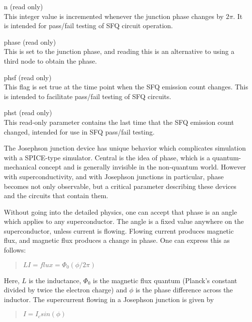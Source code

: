 \begin{description}
\item{\vt n} (read only)\\
This integer value is incremented whenever the junction phase changes
by $2\pi$.  It is intended for pass/fail testing of SFQ circuit
operation.
 
\item{\vt phase} (read only)\\
This is set to the junction phase, and reading this is an alternative
to using a third node to obtain the phase.
 
\item{\vt phsf} (read only)\\
This flag is set true at the time point when the SFQ emission count
changes.  This is intended to facilitate pass/fail testing of SFQ
circuits.

\item{\vt phst} (read only)\\
This read-only parameter contains the last time that the SFQ emission
count changed, intended for use in SFQ pass/fail testing.
\end{description}

The Josephson junction device has unique behavior which complicates
simulation with a SPICE-type simulator.  Central is the idea of phase,
which is a quantum-mechanical concept and is generally invisible in
the non-quantum world.  However with superconductivity, and with
Josephson junctions in particular, phase becomes not only observable,
but a critical parameter describing these devices and the circuits
that contain them.

Without going into the detailed physics, one can accept that phase is
an angle which applies to any superconductor.  The angle is a fixed
value anywhere on the superconductor, unless current is flowing. 
Flowing current produces magnetic flux, and magnetic flux produces a
change in phase.  One can express this as follows:

\begin{quote}
$LI = flux = \Phi_0(\phi/2\pi)$
\end{quote}

Here, $L$ is the inductance, $\Phi_0$ is the magnetic flux quantum
(Planck's constant divided by twice the electron charge) and $\phi$ is
the phase difference across the inductor.  The supercurrent flowing in
a Josephson junction is given by

\begin{quote}
$I = I_c sin(\phi)$
\end{quote}

